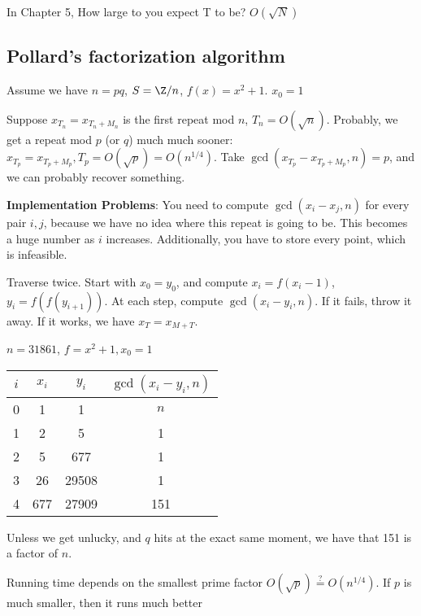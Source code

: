 \documentclass[twoside, 10pt]{article}
\begin{document}
\begin{rmk}
    In Chapter 5, How large to you expect T to be? $O(\sqrt{N})$
\end{rmk}

\subsection{Pollard's factorization algorithm} Assume we have $n = pq$, $S = \Z /n$, $f(x) = x^2 + 1$. $x_0 = 1$

Suppose $x_{T_n} = x_{T_n + M_n}$ is the first repeat mod $n$, $T_n = O(\sqrt{n})$. Probably, we get a repeat mod $p$ (or $q$) much much sooner: $x_{T_p} = x_{T_p + M_p}, T_p = O(\sqrt{p}) = O(n^{1/4})$. Take $\gcd(x_{T_p} - x_{T_p + M_p}, n) = p$, and we can probably recover something.

\textbf{Implementation Problems}: You need to compute $\gcd(x_i - x_j, n)$ for every pair $i, j$, because we have no idea where this repeat is going to be. This becomes a huge number as $i$ increases. Additionally, you have to store every point, which is infeasible.

\begin{defn}
    Traverse twice. Start with $x_0 = y_0$, and compute $x_i = f(x_i - 1)$, $y_i = f(f(y_{i + 1}))$. At each step, compute $\gcd(x_i - y_i, n)$. If it fails, throw it away. If it works, we have $x_T = x_{M + T}$.
\end{defn}

\begin{exm*}
    $n = 31861$, $f = x^2 + 1, x_0 = 1$
\end{exm*}

\begin{tabular}{c|c|c|c}
    $i$ & $x_i$ & $y_i$ & $\gcd(x_i - y_i, n)$\\
    \hline
    0 & 1 & 1 & $n$\\
    1 & 2 & 5 & 1\\
    2 & 5 & 677 & 1\\
    3 & 26 & 29508& 1\\
    4 & 677 &  27909 & 151\\
\end{tabular}

Unless we get unlucky, and $q$ hits at the exact same moment, we have that 151 is a factor of $n$.

Running time depends on the smallest prime factor $O(\sqrt{p}) \stackrel{?}{=} O(n^{1/4})$. If $p$ is much smaller, then it runs much better
\end{document}
